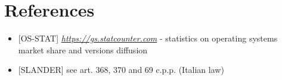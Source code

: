 \documentclass[a4paper]{report}
\begin{document}
\chapter{References}
\begin{itemize}

\item \label{ref:os-stats} [OS-STAT] \href{https://gs.statcounter.com}{\textit{https://gs.statcounter.com}} - statistics on operating systems market share and versions diffusion

\item \label{ref:slander} [SLANDER] see art. 368, 370 and 69 c.p.p. (Italian law)

\end{itemize}
\end{document}
